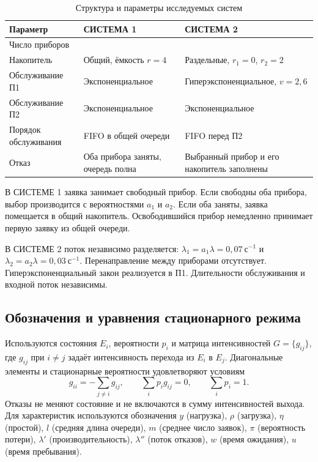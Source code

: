 \documentclass[11pt,a4paper]{article}
\newcommand{\secs}{\text{с}}
\begin{document}
\begin{table}[H]\centering
\caption{Структура и параметры исследуемых систем}
\small
\begin{tabular}{>{\raggedright\arraybackslash}p{4.4cm}>{\raggedright\arraybackslash}p{5.4cm}>{\raggedright\arraybackslash}p{5.4cm}}
\toprule
Параметр & СИСТЕМА 1 & СИСТЕМА 2\\\midrule
Число приборов & 2 & 2\\
Накопитель & Общий, ёмкость $r=4$ & Раздельные, $r_1=0$, $r_2=2$\\
Обслуживание П1 & Экспоненциальное & Гиперэкспоненциальное, $v=2{,}6$\\
Обслуживание П2 & Экспоненциальное & Экспоненциальное\\
Порядок обслуживания & FIFO в общей очереди & FIFO перед П2\\
Отказ & Оба прибора заняты, очередь полна & Выбранный прибор и его накопитель заполнены\\
\bottomrule
\end{tabular}
\end{table}

В СИСТЕМЕ 1 заявка занимает свободный прибор. Если свободны оба прибора, выбор производится с вероятностями $a_1$ и $a_2$. Если оба заняты, заявка помещается в общий накопитель. Освободившийся прибор немедленно принимает первую заявку из общей очереди.

В СИСТЕМЕ 2 поток независимо разделяется: $\lambda_1=a_1\lambda=0{,}07\ \secs^{-1}$ и $\lambda_2=a_2\lambda=0{,}03\ \secs^{-1}$. Перенаправление между приборами отсутствует. Гиперэкспоненциальный закон реализуется в П1. Длительности обслуживания и входной поток независимы.

\subsection{Обозначения и уравнения стационарного режима}
Используются состояния $E_i$, вероятности $p_i$ и матрица интенсивностей $G=\{g_{ij}\}$, где $g_{ij}$ при $i\ne j$ задаёт интенсивность перехода из $E_i$ в $E_j$. Диагональные элементы и стационарные вероятности удовлетворяют условиям
\begin{equation}
g_{ii}=-\sum_{j\ne i}g_{ij},\qquad
\sum_i p_i g_{ij}=0,\qquad \sum_i p_i=1.
\label{eq:balance}
\end{equation}
Отказы не меняют состояние и не включаются в сумму интенсивностей выхода. Для характеристик используются обозначения $y$ (нагрузка), $\rho$ (загрузка), $\eta$ (простой), $l$ (средняя длина очереди), $m$ (среднее число заявок), $\pi$ (вероятность потери), $\lambda'$ (производительность), $\lambda''$ (поток отказов), $w$ (время ожидания), $u$ (время пребывания).
\end{document}
